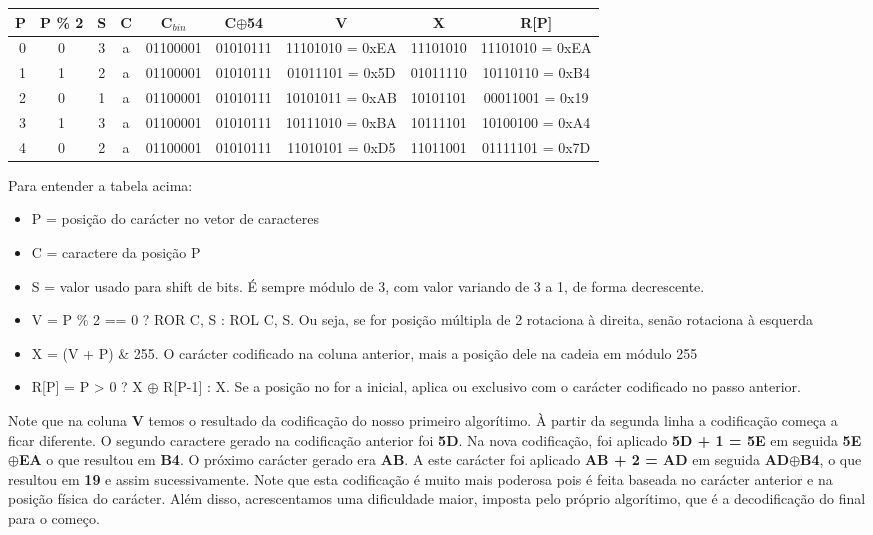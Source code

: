 \footnotesize
\noindent%
\begin{tabular}{@{}|r|c|c|c|c|c|c|c||c||}
\hline
P & P \% 2 & S & C & C$_{bin}$ & C$ \oplus $54 & V & X & R[P]\\
\hline
0 & 0 & 3 & a & 01100001 & 01010111 & 11101010 = 0xEA & 11101010 & 11101010 = 0xEA \\
1 & 1 & 2 & a & 01100001 & 01010111 & 01011101 = 0x5D & 01011110 & 10110110 = 0xB4 \\
2 & 0 & 1 & a & 01100001 & 01010111 & 10101011 = 0xAB & 10101101 & 00011001 = 0x19 \\
3 & 1 & 3 & a & 01100001 & 01010111 & 10111010 = 0xBA & 10111101 & 10100100 = 0xA4 \\
4 & 0 & 2 & a & 01100001 & 01010111 & 11010101 = 0xD5 & 11011001 & 01111101 = 0x7D \\
\hline
\end{tabular}
\normalsize


Para entender a tabela acima:
\begin{itemize}
\item P = posição do carácter no vetor de caracteres
\item C = caractere da posição P
\item S = valor usado para shift de bits. É sempre módulo de 3, com valor variando de 3 a 1, de forma decrescente.
\item V = P \% 2 == 0 ? ROR C, S : ROL C, S. Ou seja, se for posição múltipla de 2 rotaciona à direita, senão rotaciona à esquerda
\item X = (V + P) \& 255. O carácter codificado na coluna anterior, mais a posição dele na cadeia em módulo 255
\item R[P] = P > 0 ? X $ \oplus $ R[P-1] : X. Se a posição no for a inicial, aplica ou exclusivo com o carácter codificado no passo anterior.
\end{itemize}
Note que na coluna \textbf{V} temos o resultado da codificação do nosso primeiro algorítimo. À partir da segunda linha a codificação começa a ficar diferente. O segundo caractere gerado na codificação anterior foi \textbf{5D}. Na nova codificação, foi aplicado \textbf{5D + 1 = 5E} em seguida \textbf{5E$ \oplus $EA} o que resultou em \textbf{B4}. O próximo carácter gerado era \textbf{AB}. A este carácter foi aplicado \textbf{AB + 2 = AD} em seguida \textbf{AD$ \oplus $B4}, o que resultou em \textbf{19} e assim sucessivamente. Note que esta codificação é muito mais poderosa pois é feita baseada no carácter anterior e na posição física do carácter. Além disso, acrescentamos uma dificuldade maior, imposta pelo próprio algorítimo, que é a decodificação do final para o começo.

